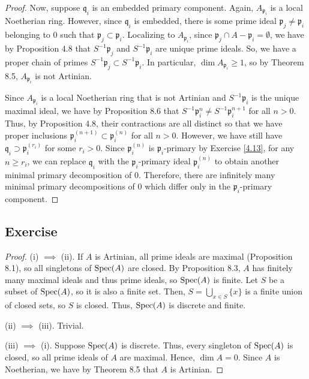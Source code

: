 \begin{proof}
Now, suppose $\mathfrak{q}_i$ is an embedded primary component. Again, $A_{\mathfrak{p}_i}$ is a local Noetherian ring. However, since $\mathfrak{q}_i$
is embedded, there is some prime ideal $\mathfrak{p}_j \neq \mathfrak{p}_i$ belonging to $0$ such that $\mathfrak{p}_j \subset \mathfrak{p}_i$. Localizing
to $A_{\mathfrak{p}_i}$, since $\mathfrak{p}_j \cap A-\mathfrak{p}_i = \emptyset$, we have by Proposition 4.8 that $S^{-1}\mathfrak{p}_j$ and 
$S^{-1}\mathfrak{p}_i$ are unique prime ideals. So, we have a proper chain of primes $S^{-1}\mathfrak{p}_j \subset S^{-1}\mathfrak{p}_i$. In particular, 
$\dim A_{\mathfrak{p}_i} \ge 1$, so by Theorem 8.5, $A_{\mathfrak{p}_i}$ is not Artinian.

Since $A_{\mathfrak{p}_i}$ is a local Noetherian ring that is not Artinian and $S^{-1}\mathfrak{p}_i$ is the unique maximal ideal, we have by Proposition 8.6
that $S^{-1}\mathfrak{p}_i^n \neq S^{-1}\mathfrak{p}_i^{n+1}$ for all $n>0$. Thus, by Proposition 4.8, their contractions are all distinct so that we have 
proper inclusions $\mathfrak{p}_i^{(n+1)} \subset \mathfrak{p}_i^{(n)}$ for all $n > 0$. However, we have still have $\mathfrak{q}_i \supset \mathfrak{p}_i^{(r_i)}$
for some $r_i > 0$. Since $\mathfrak{p}_i^{(n)}$ is $\mathfrak{p}_i$-primary by Exercise \ref{4.13}, for any $n \ge r_i$, we can replace $\mathfrak{q}_i$
with the $\mathfrak{p}_i$-primary ideal $\mathfrak{p}_i^{(n)}$ to obtain another minimal primary decomposition of $0$. Therefore, there are infinitely many
minimal primary decompositions of $0$ which differ only in the $\mathfrak{p}_i$-primary component.
\end{proof}

\subsection{Exercise}\label{8.2}

\begin{proof}
(i) $\implies$ (ii). If $A$ is Artinian, all prime ideals are maximal (Proposition 8.1), so all singletons of $\operatorname{Spec}(A)$ are closed. By Proposition 8.3,
$A$ has finitely many maximal ideals and thus prime ideals, so $\operatorname{Spec}(A)$ is finite. Let $S$ be a subset of $\operatorname{Spec}(A)$, so it is also a finite set. 
Then, $S = \bigcup_{x \in S}\{x\}$ is a finite union of closed sets, so $S$ is closed. Thus, $\operatorname{Spec}(A)$ is discrete and finite.

(ii) $\implies$ (iii). Trivial.

(iii) $\implies$ (i). Suppose $\operatorname{Spec}(A)$ is discrete. Thus, every singleton of $\operatorname{Spec}(A)$ is closed, so all prime ideals of $A$ are maximal. Hence, $\dim A = 0$.
Since $A$ is Noetherian, we have by Theorem 8.5 that $A$ is Artinian.
\end{proof}

